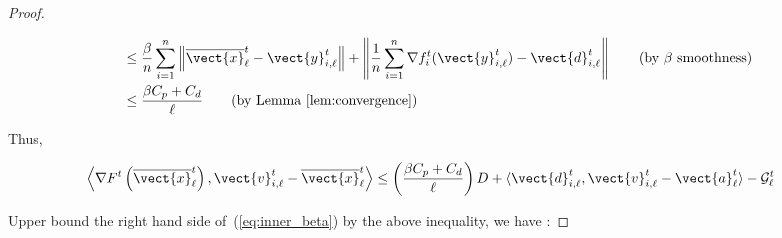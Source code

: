\begin{proof}
\begin{linenomath}
\begin{align*}
        & \leq \frac{\beta}{n} \sum_{i=1}^n \left \| \overline{\vect{x}}^t_{\ell} - \vect{y}^t_{i, \ell} \right\| + \left\|\frac{1}{n}\sum_{i=1}^n \nabla f^t_i (\vect{y}^t_{i,\ell}) - \vect{d}^t_{i, \ell} \right\| \tag{by $\beta$ smoothness}\\
        & \leq \frac{\beta C_p + C_d}{\ell}  \tag{by Lemma \ref{lem:convergence}}
    \end{align*}
\end{linenomath}
Thus,
\begin{linenomath}
    \begin{align*}
        \left \langle \nabla F^{t} \left( \overline{\vect{x}}^t_{\ell} \right) , \vect{v}^t_{i,\ell} - \overline{\vect{x}}^t_{\ell} \right \rangle 
        & \leq \left( \frac{\beta C_p + C_d}{\ell}\right)D + \langle \vect{d}^t_{i,\ell}, \vect{v}^t_{i,\ell} - \vect{a}^t_{\ell} \rangle - \mathcal{G}^t_{\ell} 
    \end{align*}
\end{linenomath}
Upper bound  the right hand side of~(\ref{eq:inner_beta}) by the above inequality, we have :



\end{proof}
